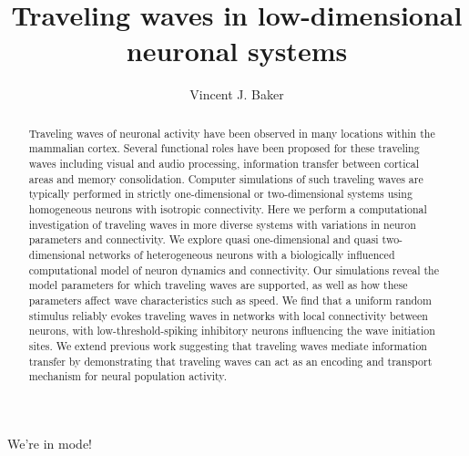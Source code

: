 \documentclass[subfig,blackref,approvalform]{drexel-thesis}
\author{Vincent J. Baker}
\title{Traveling waves in low-dimensional neuronal systems}
\begin{document}
\begin{DUTpreamble} %

\begin{dedications}
We're in  mode!

\Blindtext[3]
\end{dedications}

\begin{acknowledgments}
\Blindtext[3]
\end{acknowledgments}

\tableofcontents
\listoftables
\listoffigures

\begin{abstract}
Traveling waves of neuronal activity have been observed in many locations within the mammalian cortex.
Several functional roles have been proposed for these traveling waves including visual and audio processing, information transfer between cortical areas and memory consolidation.
Computer simulations of such traveling waves are typically performed in strictly one-dimensional or two-dimensional systems using homogeneous neurons with isotropic connectivity. 
Here we perform a computational investigation of traveling waves in more diverse systems with variations in neuron parameters and connectivity.
We explore quasi one-dimensional and quasi two-dimensional networks of heterogeneous neurons with a biologically influenced computational model of neuron dynamics and connectivity.
Our simulations reveal the model parameters for which traveling waves are supported, as well as how these parameters affect wave characteristics such as speed.
We find that a uniform random stimulus reliably evokes traveling waves in networks with local connectivity between neurons, with low-threshold-spiking inhibitory neurons influencing the wave initiation sites.
We extend previous work suggesting that traveling waves mediate information transfer by demonstrating that traveling waves can act as an encoding and transport mechanism for neural population activity.

\end{abstract}
\end{DUTpreamble}

\begin{thesis}







\end{thesis}



%

\begin{vita}
\Blindtext[3]
\end{vita}
\end{document}
